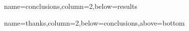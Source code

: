 \documentclass[paperwidth=48in,paperheight=36in,
fontscale=0.27,margin=0.75in]{baposter}
\begin{document}
\begin{poster}
{  }

  {name=conclusions,column=2,below=results}{%



  }

  {name=thanks,column=2,below=conclusions,above=bottom}{%



  }

\end{poster}
\end{document}
